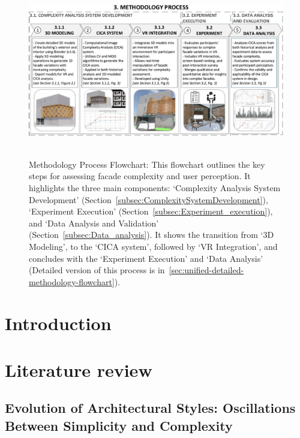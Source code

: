 %


\begin{linenumbers}

\begin{figure}[!htb]
\centering
\includegraphics[width=\linewidth]{Images/MethodologyFlowchart}~
\caption{Methodology Process Flowchart: This flowchart outlines the key steps for assessing facade complexity and user perception. It highlights the three main components: `Complexity Analysis System Development' (Section~\ref{subsec:ComplexitySystemDevelopment}), `Experiment Execution' (Section~\ref{subsec:Experiment_execution}), and `Data Analysis and Validation' (Section~\ref{subsec:Data_analysis}). It shows the transition from `3D Modeling', to the `CICA system', followed by `VR Integration', and concludes with the `Experiment Execution' and `Data Analysis' (Detailed version of this process is in~\ref{sec:unified-detailed-methodology-flowchart}).}
\label{fig:MethodologyFlowchartComplexity}
\end{figure}
\section{Introduction}
\label{sec:1Introduction}




\section{Literature review}
\label{sec:LiteratureReview}


\subsection{Evolution of Architectural Styles: Oscillations Between Simplicity and Complexity}
\label{subsec:TimelineArchitectureStyles}





\end{linenumbers}
